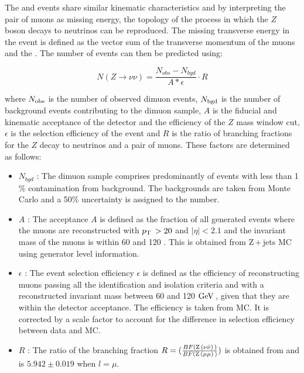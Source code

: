 The \zmumu and \znunu events share similar kinematic characteristics and by interpreting the pair of muons as missing energy, the topology of the process in which the $Z$ boson decays to neutrinos can be reproduced.  The missing transverse energy in the \zmumu event is defined as the vector sum of the transverse momentum of the muons and the \MET. The number of \znunu events can then be predicted using:

\begin{equation}
N(Z\rightarrow\nu\nu) = \frac{N_{obs} - N_{bgd}}{A*\epsilon}\cdot R 
\end{equation}

where $N_{\rm obs}$ is the number of observed dimuon events, $N_{\rm bgd}$ is the number of background events contributing to the dimuon sample, $A$ is the fiducial and kinematic acceptance of the detector and the efficiency of the $Z$ mass window cut, $\epsilon$ is the selection efficiency of the event and $R$ is the ratio of branching fractions for the $Z$ decay to neutrinos and a pair of muons. These factors are determined as follows:
\begin{itemize}

\item $N_{bgd}$ : The dimuon sample comprises predominantly of \zmumu events with less than 1$\%$ contamination from background. The backgrounds are taken from Monte Carlo and a 50\% uncertainty is assigned to the number. 

\item $A$ : The acceptance $A$ is defined as the fraction of all generated events where the muons are reconstructed with $p_{\text{T}}\, > 20$ \GeV and $|\eta| < 2.1$ and the invariant mass of the muons is within 60 \GeV and 120 \GeV. This is obtained from Z\,+\,jets MC using generator level information.

\item $\epsilon$ : The event selection efficiency $\epsilon$ is defined as the efficiency of reconstructing muons passing all the identification and isolation criteria and with a reconstructed invariant mass between 60 and 120 $\mathrm{GeV}\,$, given that they are within the detector acceptance. 
The efficiency is taken from MC.
It is corrected by a scale factor to account for the difference in selection efficiency between data and MC.

\item $R$ : The ratio of the branching fraction $R = (\frac{BF(\mathrm{Z}\, ( \nu \bar{\nu} )\,)}{BF(\mathrm{Z}\, (\mu \mu)\,)})$ is obtained from \cite{bib:BKG_PDG} and 
   is $5.942\pm 0.019$ when $l=\mu$. 
\end{itemize}
 
